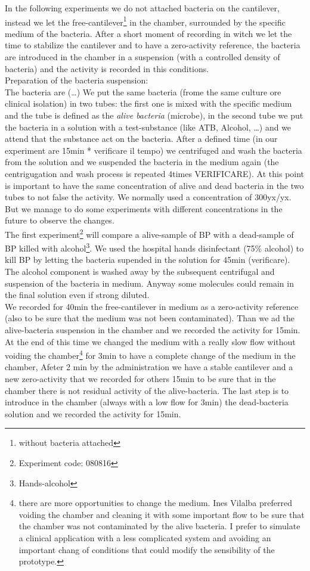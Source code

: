 \documentclass[11pt, a4paper]{article}
\begin{document}
In the following experiments we do not attached bacteria on the cantilever, instead we let the free-cantilever\footnote{without bacteria attached} in the chamber, surrounded by the specific medium of the bacteria. After a short moment of recording in witch we let the time to stabilize the cantilever and to have a zero-activity reference, the bacteria are introduced in the chamber in a suspension (with a controlled density of bacteria) and the activity is recorded in this conditions. \\
Preparation of the bacteria suspension: \\
The bacteria are (…) %
We put the same bacteria (frome the same culture ore clinical isolation) in two tubes: the first one is mixed with the specific medium and the tube is defined as the \textit{alive bacteria} (microbe), in the second tube we put the bacteria in a solution with a test-substance (like ATB, Alcohol, …) and we attend that the substance act on the bacteria. After a defined time (in our experiment are 15min * verificare il tempo) we centrifuged and wash the bacteria from the solution and we suspended the bacteria in the medium again (the centrigugation and wash process is repeated 4times VERIFICARE). At this point is important to have the same concentration of alive and dead bacteria in the two tubes to not false the activity. We normally used a concentration of 300yx/yx. But we manage to do some experiments with different concentrations in the future to observe the changes. 
\\
The first experiment\footnote{Experiment code: 080816} will compare a alive-sample of BP with a dead-sample of BP killed with alcohol\footnote{Hands-alcohol}. We used the hospital hands disinfectant (75\% alcohol) to kill BP by letting the bacteria supended in the solution for 45min (verificare). The alcohol component is washed away by the subsequent centrifugal and suspension of the bacteria in medium. Anyway some molecules could remain in the final solution even if strong diluted.\\
We recorded for 40min the free-cantilever in medium as a zero-activity reference (also to be sure that the medium was not been contaminated). Than we ad the alive-bacteria suspension in the chamber and we recorded the activity for 15min. At the end of this time we changed the medium with a really slow flow without voiding the chamber\footnote{there are more opportunities to change the medium. Ines Vilalba preferred voiding the chamber and cleaning it with some important flow to be sure that the chamber was not contaminated by the alive bacteria. I prefer to simulate a clinical application with a less complicated system and avoiding an important chang of conditions that could modify the sensibility of the prototype.} for 3min to have a complete change of the medium in the chamber, Afeter 2 min by the administration we have a stable cantilever and a new zero-activity that we recorded for others 15min to be sure that in the chamber there is not residual activity of the alive-bacteria. The last step is to introduce in the chamber (always with a low flow for 3min) the dead-bacteria solution and we recorded the activity for 15min. \\
\end{document}
